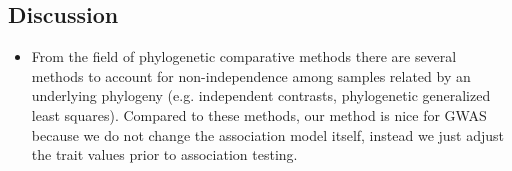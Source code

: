 \documentclass[]{article}
\begin{document}
\begin{doublespace}
\section{Discussion}
\begin{itemize}
	\item From the field of phylogenetic comparative methods there are several methods to account for non-independence among samples related by an underlying phylogeny (e.g. independent contrasts, phylogenetic generalized least squares). Compared to these methods, our method is nice for GWAS because we do not change the association model itself, instead we just adjust the trait values prior to association testing.
\end{itemize}



\end{doublespace}
\end{document}
